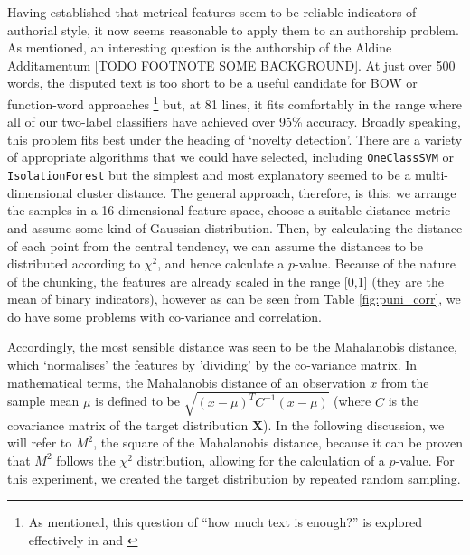 \documentclass[11pt,a4paper]{scrartcl} %
\begin{document}
Having established that metrical features seem to be reliable indicators of authorial style, it now seems reasonable to apply them to an authorship problem. As mentioned, an interesting question is the authorship of the Aldine Additamentum [TODO FOOTNOTE SOME BACKGROUND]. At just over 500 words, the disputed text is too short to be a useful candidate for BOW or function-word approaches%
\footnote{As mentioned, this question of ``how much text is enough?'' is explored effectively in \cite{eder_does_2015} and \cite{eder_short_2017}}
but, at 81 lines, it fits comfortably in the range where all of our two-label classifiers have achieved over 95\% accuracy. Broadly speaking, this problem fits best under the heading of `novelty detection'. There are a variety of appropriate algorithms that we could have selected, including \texttt{OneClassSVM} or \texttt{IsolationForest} but the simplest and most explanatory seemed to be a multi-dimensional cluster distance. The general approach, therefore, is this: we arrange the samples in a 16-dimensional feature space, choose a suitable distance metric and assume some kind of Gaussian distribution. Then, by calculating the distance of each point from the central tendency, we can assume the distances to be distributed according to $\chi^{2}$, and hence calculate a $p$-value. Because of the nature of the chunking, the features are already scaled in the range [0,1] (they are the mean of binary indicators), however as can be seen from Table \ref{fig:puni_corr}, we do have some problems with co-variance and correlation.
\begin{table}
\caption{Some highly correlated features in Silius' \textit{Punica}}
\label{fig:puni_corr}
\phantom{x}
\centering
{}
\end{table}
Accordingly, the most sensible distance was seen to be the Mahalanobis distance, which `normalises' the features by 'dividing' by the co-variance matrix. In mathematical terms, the Mahalanobis distance of an observation $x$ from the sample mean $\mu$ is defined to be $\sqrt{(x-\mu)^{T}C^{-1}(x-\mu)}$ (where $C$ is the covariance matrix of the target distribution $\textbf{X}$). In the following discussion, we will refer to $M^{2}$, the square of the Mahalanobis distance, because it can be proven that $M^{2}$ follows the $\chi^{2}$ distribution, allowing for the calculation of a $p$-value. For this experiment, we created the target distribution by repeated random sampling.%
\end{document}
